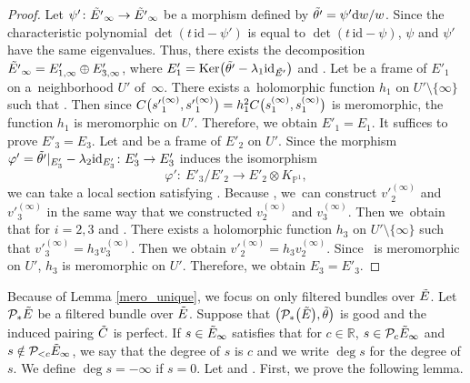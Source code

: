 \documentclass[pdftex]{sigma}
\numberwithin{equation}{section}
\newcommand{\R}{\mathbb{R}}
\newcommand{\ps}{\mathbb{P}}
\newcommand{\id}{\mathrm{id}}
\newcommand{\Ker}{\operatorname{Ker}}
\begin{document}
\begin{proof}
 Let $\psi'\colon \Tilde{E'}_{\infty}\to\Tilde{E'}_{\infty}$ be a morphism defined by $\Tilde{\theta '}= \psi' {\rm d}w/w$. Since the characteristic polynomial $\det(t\,\id- \psi')$ is equal to $\det(t\,\id- \psi)$, $\psi$ and $\psi'$ have the same eigenvalues. Thus, there exists the decomposition $\Tilde{E'}_{\infty}=E'_{1,\infty}\oplus E'_{3,\infty}$, where ${E'_1 = \Ker\bigl(\Tilde{\theta '}-\lambda_1 \id_{\Tilde{E'}}\bigr)}$ and \smash{${E'_3 = \Ker\bigl(\Tilde{\theta '}-\lambda_2 \id_{\Tilde{E'}}\bigr)^2}$}. Let  be a frame of $E'_{1}$ on a~neighborhood $U'$ of~$\infty$. There exists a~holomorphic function $h_1$ on $U'\setminus\{\infty\}$ such that . Then since $\smash{C\bigl({s'}_1^{(\infty)},{s'}_1^{(\infty)}\bigr)} = \smash{h_1^2 C\bigl(s_1^{(\infty)},s_1^{(\infty)}\bigr)}$ is meromorphic, the function $h_1$ is meromorphic on $U'$. Therefore, we obtain $E'_{1} = E_{1}$. It suffices to prove $E'_{3} = E_{3}$. Let \smash{$E'_2 = \Ker\bigl(\Tilde{\theta '}-\lambda_2 \id_{\Tilde{E'}}\bigr)$} and  be a frame of $E'_{2}$ on $U'$. Since the morphism $\varphi' = \Tilde{\theta '}|_{E'_3}-\lambda_2 \id_{E'_3} \colon E'_3\to E'_3$ induces the isomorphism
 \begin{equation*}
 \varphi' \colon \ E'_3 / E'_2 \to E'_2 \otimes K_{\ps^1},
 \end{equation*}
 we can take a local section  satisfying . Because , we~can construct ${v'}_2^{(\infty)}$ and ${v'}_3^{(\infty)}$ in the same way that we constructed $v^{(\infty)}_2$ and $v^{(\infty)}_3$. Then we~obtain that  for $i=2,3$ and . There exists a holomorphic function $h_3$ on $U'\setminus\{\infty\}$ such that ${v'}_3^{(\infty)} = h_3 v_3^{(\infty)}$. Then we obtain ${v'}_2^{(\infty)} = h_3 v_2^{(\infty)}$. Since~ is meromorphic on $U'$, $h_3$ is meromorphic on $U'$. Therefore, we obtain $E_3 = E'_3$.
\end{proof}

Because of Lemma \ref{mero_unique}, we focus on only filtered bundles over $\Tilde{E}$.
Let $\mathcal{P}_*\Tilde{E}$ be a filtered bundle over $\Tilde{E}$. Suppose that $\big(\mathcal{P}_*\bigl(\Tilde{E}\bigr),\Tilde{\theta}\big)$ is good and the induced pairing $\Tilde{C}$ is perfect. If $s\in \Tilde{E}_{\infty}$ satisfies that for $c\in\R$, $s\in \mathcal{P}_{c}\Tilde{E}_{\infty}$ and $s\notin \mathcal{P}_{<c}\Tilde{E}_{\infty}$, we say that
 the degree of $s$ is $c$ and we write $\deg{s}$ for the degree of $s$. We define $\deg{s}=-\infty$ if $s=0$. Let  and .
First, we prove the following lemma.
\end{document}

